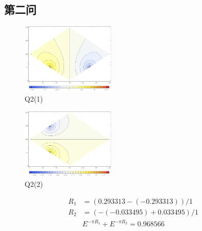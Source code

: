 \documentclass[10pt, a4paper]{article}
\begin{document}
    \subsection{第二问}
    \begin{figure}[H]
        \centering
        \includegraphics[width=0.4\textwidth]{Q2(1).png}
        \caption{Q2(1)}\label{fig:Q2(1)}
    \end{figure}
    \begin{figure}[H]
        \centering
        \includegraphics[width=0.4\textwidth]{Q2(2).png}
        \caption{Q2(2)}\label{fig:Q2(2)}
    \end{figure}

    \begin{align*}
        R_1&=(0.293313 -(-0.293313))/1\\
        R_2&=(-(-0.033495) + 0.033495)/1\\
        &E^{-\pi R_1}+E^{-\pi R_2}=0.968566
    \end{align*}
\end{document}
